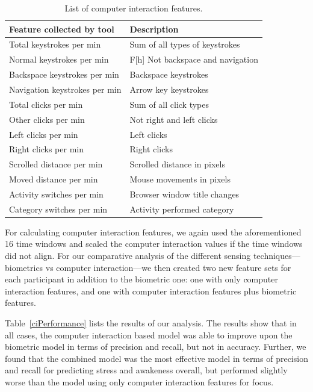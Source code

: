 \begin{table}
\begin{center}
\begin{tabularx}{\columnwidth}{l l}
\hline
Feature collected by tool & Description \\ 
\hline
Total keystrokes per min& Sum of all types of keystrokes \\ 
Normal keystrokes per min&F[h] Not backspace and navigation \\ 
Backspace keystrokes per min& Backspace keystrokes \\ 
Navigation keystrokes per min& Arrow key keystrokes \\ 
Total clicks per min& Sum of all click types \\ 
Other clicks per min& Not right and left clicks \\ 
Left clicks per min& Left clicks \\ 
Right clicks per min& Right clicks \\ 
Scrolled distance per min& Scrolled distance in pixels \\ 
Moved distance per min& Mouse movements in pixels \\ 
Activity switches per min& Browser window title changes \\ 
Category switches per min& Activity performed category \\ 
\hline
\end{tabularx}
\caption{List of computer interaction features.}%
\label{tracker}
\end{center}
\vspace*{-7mm}
\end{table}

For calculating computer interaction features, we again used the aforementioned 16 time windows and scaled the computer interaction values if the time windows did not align. For our comparative analysis of the different sensing techniques---biometrics vs computer interaction---we then created two new feature sets for each participant in addition to the biometric one: one with only computer interaction features, and one with computer interaction features plus biometric features. 

Table~\ref{ciPerformance} lists the results of our analysis. The results show that in all cases, the computer interaction based model was able to improve upon the biometric model in terms of precision and recall, but not in accuracy. Further, we found that the combined model was the most effective model in terms of precision and recall for predicting stress and awakeness overall, but performed slightly worse than the model using only computer interaction features for focus. 


